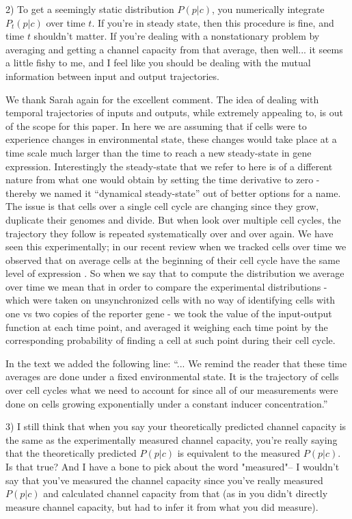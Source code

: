 \begin{tcolorbox}
2)  To get a seemingly static distribution $P(p|c)$, you numerically integrate
$P_t(p|c)$ over time $t$.  If you're in steady state, then this procedure is
fine, and time $t$ shouldn't matter.  If you're dealing with a nonstationary
problem by averaging and getting a channel capacity from that average, then
well... it seems a little fishy to me, and I feel like you should be dealing
with the mutual information between input and output trajectories.
\end{tcolorbox}

We thank Sarah again for the excellent comment. The idea of dealing with
temporal trajectories of inputs and outputs, while extremely appealing to, is
out of the scope for this paper. In here we are assuming that if cells were to
experience changes in environmental state, these changes would take place at a
time scale much larger than the time to reach a new steady-state in gene
expression. Interestingly the steady-state that we refer to here is of a
different nature from what one would obtain by setting the time derivative to
zero - thereby we named it ``dynamical steady-state'' out of better options for
a name. The issue is that cells over a single cell cycle are changing since they
grow, duplicate their genomes and divide. But when look over multiple cell
cycles, the trajectory they follow is repeated systematically over and over
again. We have seen this experimentally; in our recent review when we tracked
cells over time we observed that on average cells at the beginning of their cell
cycle have the same level of expression \cite{Phillips2019}. So when we say that
to compute the distribution we average over time we mean that in order to
compare the experimental distributions - which were taken on unsynchronized
cells with no way of identifying cells with one vs two copies of the reporter
gene - we took the value of the input-output function at each time point, and
averaged it weighing each time point by the corresponding probability of finding
a cell at such point during their cell cycle.

In the text we added the following line:
``... We remind the reader that these time averages are done under a fixed
environmental state. It is the trajectory of cells over cell cycles what we need
to account for since all of our measurements were done on cells growing
exponentially under a constant inducer concentration.''

\begin{tcolorbox}
3)  I still think that when you say your theoretically predicted channel
capacity is the same as the experimentally measured channel capacity, you're
really saying that the theoretically predicted $P(p|c)$ is equivalent to the
measured $P(p|c)$.  Is that true?  And I have a bone to pick about the word
"measured"-- I wouldn't say that you've measured the channel capacity since
you've really measured $P(p|c)$ and calculated channel capacity from that (as in
you didn't directly measure channel capacity, but had to infer it from what you
did measure).
\end{tcolorbox}

